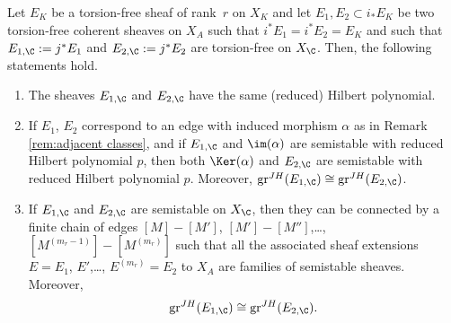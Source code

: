 \begin{Prop}\label{prop:separation} Let $E_K$ be a
torsion-free sheaf of rank~$r$ on $X_K$ and let $E_1, E_2\subset i_*E_K$ be two torsion-free coherent sheaves on $X_A$ such that $i^*E_1=i^*E_2=E_K$ and such that $E_{1,\C}:=j^*E_1$ and $E_{2,\C}:=j^*E_2$ are torsion-free on $X_\C$. Then, the following statements hold.
\begin{enumerate}
\item The sheaves $E_{1,\C}$ and $E_{2,\C}$ have the same (reduced) Hilbert polynomial.
\item If $E_1$, $ E_2$ correspond to an edge with induced morphism $\alpha$ as in Remark \ref{rem:adjacent classes}, and if $E_{1,\C}$ and $\im(\alpha)$ are semistable with reduced Hilbert polynomial $p$, then both $\Ker(\alpha)$ and $E_{2,\C}$ are semistable with reduced Hilbert polynomial $p$. Moreover, $\mathrm{gr}^{JH}(E_{1,\C})\cong\mathrm{gr}^{JH}(E_{2,\C})$.
\item If $E_{1,\C}$ and $E_{2,\C}$ are semistable on $X_\C$, then they can be connected by a finite chain of edges $
[M] -[M']$, $[M'] -[M'']$,\dots, $[M^{(m_{r}-1)}] -[M^{(m_{r})}]$ such that all the associated sheaf extensions $E=E_1$, $E'$,\dots, $E^{(m_r)}=E_2$ to $X_A$ are families of semistable sheaves. Moreover,
\[
\mathrm{gr}^{JH}(E_{1,\C})\cong\mathrm{gr}^{JH}(E_{2,\C}).
\]
\end{enumerate}
\end{Prop}
